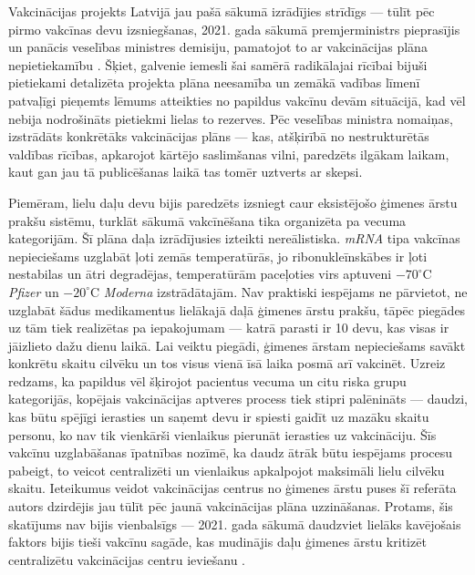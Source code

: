 \documentclass[12pt, a4paper]{article}
\numberwithin{equation}{section} %
\begin{document}
Vakcinācijas projekts Latvijā jau pašā sākumā izrādījies strīdīgs --- tūlīt pēc pirmo vakcīnas devu izsniegšanas, 2021. gada sākumā premjerministrs pieprasījis un panācis veselības ministres demisiju, pamatojot to ar vakcinācijas plāna nepietiekamību \cite{lv_minister_fired}. Šķiet, galvenie iemesli šai samērā radikālajai rīcībai bijuši pietiekami detalizēta projekta plāna neesamība un zemākā vadības līmenī patvaļīgi pieņemts lēmums atteikties no papildus vakcīnu devām situācijā, kad vēl nebija nodrošināts pietiekmi lielas to rezerves. Pēc veselības ministra nomaiņas, izstrādāts konkrētāks vakcinācijas plāns \cite{lv_vaxx_plan} --- kas, atšķirībā no nestrukturētās valdības rīcības, apkarojot kārtējo saslimšanas vilni, paredzēts ilgākam laikam, kaut gan jau tā publicēšanas laikā tas tomēr uztverts ar skepsi. 

Piemēram, lielu daļu devu bijis paredzēts izsniegt caur eksistējošo ģimenes ārstu prakšu sistēmu, turklāt sākumā vakcīnēšana tika organizēta pa vecuma kategorijām. Šī plāna daļa izrādījusies izteikti nereālistiska. \textit{mRNA} tipa vakcīnas nepieciešams uzglabāt ļoti zemās temperatūrās, jo ribonukleīnskābes ir ļoti nestabilas un ātri degradējas, temperatūrām paceļoties virs aptuveni $-70^\circ$C \textit{Pfizer} un $-20^\circ$C \textit{Moderna} izstrādātajām. Nav praktiski iespējams ne pārvietot, ne uzglabāt šādus medikamentus lielākajā daļā ģimenes ārstu prakšu, tāpēc piegādes uz tām tiek realizētas pa iepakojumam --- katrā parasti ir 10 devu, kas visas ir jāizlieto dažu dienu laikā. Lai veiktu piegādi, ģimenes ārstam nepieciešams savākt konkrētu skaitu cilvēku un tos visus vienā īsā laika posmā arī vakcinēt. Uzreiz redzams, ka papildus vēl šķirojot pacientus vecuma un citu riska grupu kategorijās, kopējais vakcinācijas aptveres process tiek stipri palēnināts --- daudzi, kas būtu spējīgi ierasties un saņemt devu ir spiesti gaidīt uz mazāku skaitu personu, ko nav tik vienkārši vienlaikus pierunāt ierasties uz vakcināciju. Šīs vakcīnu uzglabāšanas īpatnības nozīmē, ka daudz ātrāk būtu iespējams procesu pabeigt, to veicot centralizēti un vienlaikus apkalpojot maksimāli lielu cilvēku skaitu. Ieteikumus veidot vakcinācijas centrus no ģimenes ārstu puses šī referāta autors dzirdējis jau tūlīt pēc jaunā vakcinācijas plāna uzzināšanas. Protams, šis skatījums nav bijis vienbalsīgs --- 2021. gada sākumā daudzviet lielāks kavējošais faktors bijis tieši vakcīnu sagāde, kas mudinājis daļu ģimenes ārstu kritizēt centralizētu vakcinācijas centru ieviešanu \cite{vaxx_center_oppose}.
\end{document}
